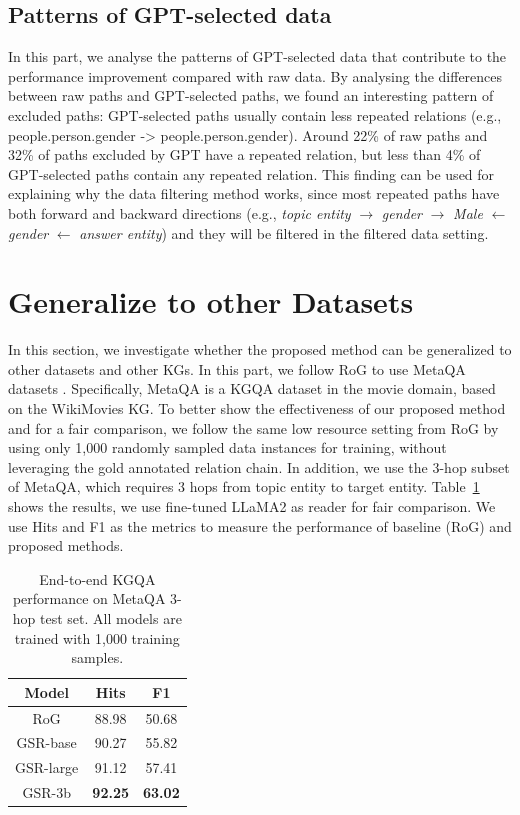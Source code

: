 \documentclass[11pt]{article}
\begin{document}
\subsection{Patterns of GPT-selected data}
In this part, we analyse the patterns of GPT-selected data that contribute to the performance improvement compared with raw data. By analysing the differences between raw paths and GPT-selected paths, we found an interesting pattern of excluded paths: GPT-selected paths usually contain less repeated relations (e.g., people.person.gender -> people.person.gender). Around 22\% of raw paths and 32\% of paths excluded by GPT have a repeated relation, but less than 4\% of GPT-selected paths contain any repeated relation. This finding can be used for explaining why the data filtering method works, since most repeated paths have both forward and backward directions (e.g., \textit{topic entity} $\rightarrow$ \textit{gender} $\rightarrow$ \textit{Male} $\leftarrow$ \textit{gender} $\leftarrow$ \textit{answer entity}) and they will be filtered in the filtered data setting.

\section{Generalize to other Datasets}
In this section, we investigate whether the proposed method can be generalized to other datasets and other KGs. In this part, we follow RoG \citep{luo2024reasoning} to use MetaQA datasets \citep{zhang2017variational}. Specifically, MetaQA is a KGQA dataset in the movie domain, based on the WikiMovies KG. To better show the effectiveness of our proposed method and for a fair comparison, we follow the same low resource setting from RoG by using only 1,000 randomly sampled data instances for training, without leveraging the gold annotated relation chain. In addition, we use the 3-hop subset of MetaQA, which requires 3 hops from topic entity to target entity. Table~\ref{tab:metaqa} shows the results, we use fine-tuned LLaMA2 as reader for fair comparison. We use Hits and F1 as the metrics to measure the performance of baseline (RoG) and proposed methods.

\begin{table}[]
    \centering
    \begin{tabular}{c|cc}
    \toprule
        \bf{Model} & \bf{Hits} & \bf{F1} \\
        \midrule
        RoG	& 88.98 & 50.68 \\ \midrule
        GSR-base & 90.27 & 55.82 \\
        GSR-large & 91.12 & 57.41 \\
        GSR-3b & \textbf{92.25} & \textbf{63.02} \\
        \bottomrule

    \end{tabular}
    \caption{End-to-end KGQA performance on MetaQA 3-hop test set. All models are trained with 1,000 training samples.}
    \label{tab:metaqa}
\end{table}
\end{document}
